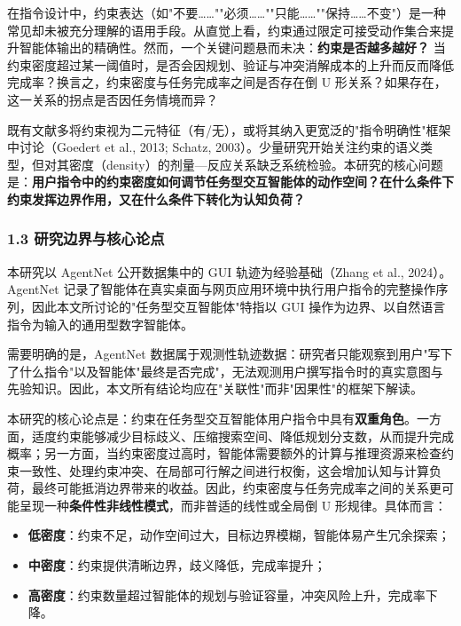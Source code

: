 \documentclass[12pt,a4paper,openany,oneside]{ctexrep}
\begin{document}
在指令设计中，约束表达（如"不要……""必须……""只能……""保持……不变"）是一种常见却未被充分理解的语用手段。从直觉上看，约束通过限定可接受动作集合来提升智能体输出的精确性。然而，一个关键问题悬而未决：\textbf{约束是否越多越好？} 当约束密度超过某一阈值时，是否会因规划、验证与冲突消解成本的上升而反而降低完成率？换言之，约束密度与任务完成率之间是否存在倒 U 形关系？如果存在，这一关系的拐点是否因任务情境而异？

既有文献多将约束视为二元特征（有/无），或将其纳入更宽泛的"指令明确性"框架中讨论（Goedert et al., 2013; Schatz, 2003）。少量研究开始关注约束的语义类型，但对其密度（density）的剂量—反应关系缺乏系统检验。本研究的核心问题是：\textbf{用户指令中的约束密度如何调节任务型交互智能体的动作空间？在什么条件下约束发挥边界作用，又在什么条件下转化为认知负荷？}

\subsubsection{1.3 研究边界与核心论点}


本研究以 AgentNet 公开数据集中的 GUI 轨迹为经验基础（Zhang et al., 2024）。AgentNet 记录了智能体在真实桌面与网页应用环境中执行用户指令的完整操作序列，因此本文所讨论的"任务型交互智能体"特指以 GUI 操作为边界、以自然语言指令为输入的通用型数字智能体。

需要明确的是，AgentNet 数据属于观测性轨迹数据：研究者只能观察到用户"写下了什么指令"以及智能体"最终是否完成"，无法观测用户撰写指令时的真实意图与先验知识。因此，本文所有结论均应在"关联性"而非"因果性"的框架下解读。

本研究的核心论点是：约束在任务型交互智能体用户指令中具有\textbf{双重角色}。一方面，适度约束能够减少目标歧义、压缩搜索空间、降低规划分支数，从而提升完成概率；另一方面，当约束密度过高时，智能体需要额外的计算与推理资源来检查约束一致性、处理约束冲突、在局部可行解之间进行权衡，这会增加认知与计算负荷，最终可能抵消边界带来的收益。因此，约束密度与任务完成率之间的关系更可能呈现一种\textbf{条件性非线性模式}，而非普适的线性或全局倒 U 形规律。具体而言：

\begin{itemize}
\item \textbf{低密度}：约束不足，动作空间过大，目标边界模糊，智能体易产生冗余探索；
\item \textbf{中密度}：约束提供清晰边界，歧义降低，完成率提升；
\item \textbf{高密度}：约束数量超过智能体的规划与验证容量，冲突风险上升，完成率下降。
\end{itemize}
\end{document}
